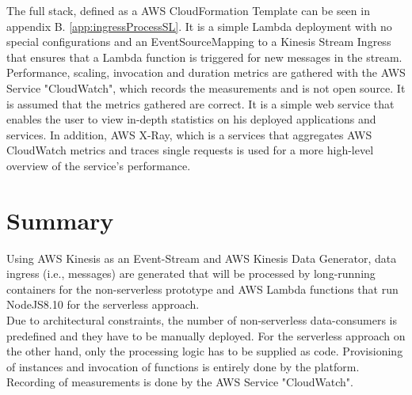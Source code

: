 The full stack, defined as a AWS CloudFormation Template can be seen in appendix B. \vref{app:ingressProcessSL}. It is a simple Lambda deployment with no special configurations and an EventSourceMapping to a Kinesis Stream Ingress that ensures that a Lambda function is triggered for new messages in the stream.\\
Performance, scaling, invocation and duration metrics are gathered with the AWS Service "CloudWatch", which records the measurements and is not open source. It is assumed that the metrics gathered are correct. It is a simple web service that enables the user to view in-depth statistics on his deployed applications and services. In addition, AWS X-Ray, which is a services that aggregates AWS CloudWatch metrics and traces single requests is used for a more high-level overview of the service's performance. 


\section{Summary}

Using AWS Kinesis as an Event-Stream and AWS Kinesis Data Generator, data ingress (i.e., messages) are generated that will be processed by long-running containers for the non-serverless prototype and AWS Lambda functions that run NodeJS8.10 for the serverless approach.\\
Due to architectural constraints, the number of non-serverless data-consumers is predefined and they have to be manually deployed. For the serverless approach on the other hand, only the processing logic has to be supplied as code. Provisioning of instances and invocation of functions is entirely done by the platform. \\
Recording of measurements is done by the AWS Service "CloudWatch".